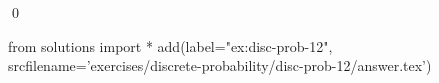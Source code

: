 
\begin{ex} 
  \label{ex:disc-prob-12}
  
  \qed
\end{ex} 
\begin{python0}
from solutions import *
add(label="ex:disc-prob-12",
    srcfilename='exercises/discrete-probability/disc-prob-12/answer.tex') 
\end{python0}
